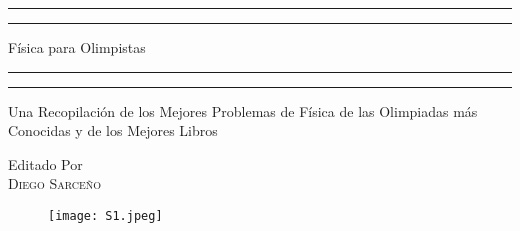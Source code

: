
\begin{titlepage} %
	\centering %
	\scshape %
	\vspace*{\baselineskip} %
	
	
	\rule{\textwidth}{1.6pt}\vspace*{-\baselineskip}\vspace*{2pt} %
	\rule{\textwidth}{0.4pt} %
	
	\vspace{0.75\baselineskip} %
	{\LARGE Física para Olimpistas \\} %
	\vspace{0.75\baselineskip} %
	\rule{\textwidth}{0.4pt}\vspace*{-\baselineskip}\vspace{3.2pt} %
	\rule{\textwidth}{1.6pt} %
	\vspace{2\baselineskip} %
	
	
	Una Recopilación de los Mejores Problemas de Física de las Olimpiadas más Conocidas y de los Mejores Libros %
	\vspace*{3\baselineskip} %
	
	
	Editado Por \\
	\vspace{0.5\baselineskip} %
	{\scshape\Large Diego Sarceño} %
	\vspace{0.5\baselineskip} %
	\begin{figure}[H]
	    \centering
	    \texttt{[image: S1.jpeg]}
	    \label{LogoPersonal}
	\end{figure}        %
	

\end{titlepage}
